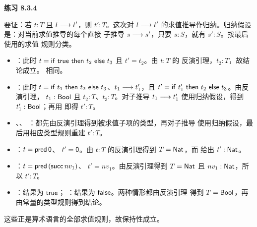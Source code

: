 \begin{taplsolutionentrybox}
\label{sol:translator:8.3.4}
\textbf{练习 8.3.4}

要证：若 \(t:T\) 且 \(t\mathrel{\longrightarrow} t'\)，则 \(t':T\)。这次对
\(t\mathrel{\longrightarrow} t'\) 的求值推导作归纳。归纳假设是：对当前求值推导的每个直接
子推导 \(s\mathrel{\longrightarrow} s'\)，只要 \(s:S\)，就有 \(s':S\)。按最后使用的求值
规则分类。

\begin{itemize}
  \item {}：此时
    \(t=\mathsf{if}\ \mathsf{true}\ \mathsf{then}\ t_2\ \mathsf{else}\ t_3\) 且 \(t'=t_2\)。由 \(t:T\) 的
    反演引理，\(t_2:T\)，故结论成立。 相同。

  \item {}：此时
    \(t=\mathsf{if}\ t_1\ \mathsf{then}\ t_2\ \mathsf{else}\ t_3\)、\(t_1\mathrel{\longrightarrow} t_1'\)，且
    \(t'=\mathsf{if}\ t_1'\ \mathsf{then}\ t_2\ \mathsf{else}\ t_3\)。由反演引理，
    \(t_1:\mathsf{Bool}\) 且 \(t_2:T\)、\(t_3:T\)。对子推导
    \(t_1\mathrel{\longrightarrow} t_1'\) 使用归纳假设，得到
    \(t_1':\mathsf{Bool}\)；再用  即得 \(t':T\)。

  \item {}、、
    ：都先由反演引理得到被求值子项的类型，再对子推导
    使用归纳假设，最后用相应类型规则重建 \(t':T\)。

  \item {}：\(t=\mathsf{pred}\,\mathsf{0}\)、
    \(t'=\mathsf{0}\)。由 \(t:T\) 的反演引理得到
    \(T=\mathsf{Nat}\)，而  给出
    \(t':\mathsf{Nat}\)。

  \item {}：\(t=\mathsf{pred}\,(\mathsf{succ}\,nv_1)\)、
    \(t'=nv_1\)。由反演引理得到 \(T=\mathsf{Nat}\) 且
    \(nv_1:\mathsf{Nat}\)，所以 \(t':T\)。

  \item {}：结果为 \(\mathsf{true}\)；
    ：结果为 \(\mathsf{false}\)。两种情形都由反演引理
    得到 \(T=\mathsf{Bool}\)，再由常量的类型规则得到结论。
\end{itemize}

这些正是算术语言的全部求值规则，故保持性成立。

\end{taplsolutionentrybox}
